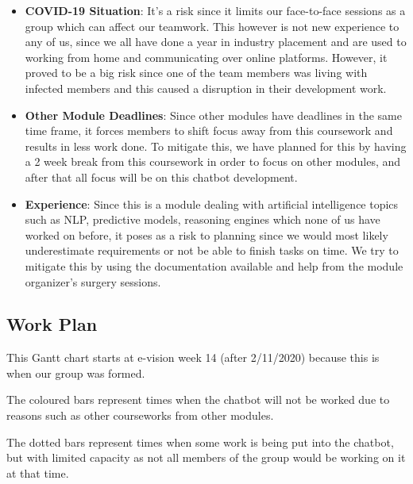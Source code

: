 \documentclass[11pt]{article}
\begin{document}
    \begin{itemize}
        \item \textbf{COVID-19 Situation}: It's a risk since it limits our face-to-face sessions as a group which can affect our teamwork. This however is not new experience to any of us, since we all have done a year in industry placement and are used to working from home and communicating over online platforms. However, it proved to be a big risk since one of the team members was living with infected members and this caused a disruption in their development work.
    
        \item \textbf{Other Module Deadlines}: Since other modules have deadlines in the same time frame, it forces members to shift focus away from this coursework and results in less work done. To mitigate this, we have planned for this by having a 2 week break from this coursework in order to focus on other modules, and after that all focus will be on this chatbot development.
    
        \item \textbf{Experience}: Since this is a module dealing with artificial intelligence topics such as NLP, predictive models, reasoning engines which none of us have worked on before, it poses as a risk to planning since we would most likely underestimate requirements or not be able to finish tasks on time. We try to mitigate this by using the documentation available and help from the module organizer's surgery sessions.
    \end{itemize}

    \subsection{Work Plan}

    This Gantt chart starts at e-vision week 14 (after 2/11/2020) because this is when our group was formed.


    The coloured bars represent times when the chatbot will not be worked due to reasons such as other courseworks from other modules.


    The dotted bars represent times when some work is being put into the chatbot, but with limited capacity as not all members of the group would be working on it at that time.
\end{document}
